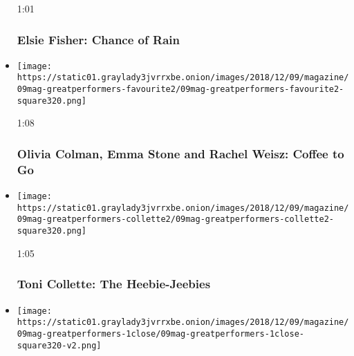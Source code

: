 \begin{itemize}
  1:01

  \hypertarget{elsie-fisher-chance-of-rain}{%
  \subsubsection{Elsie Fisher: Chance of
  Rain}\label{elsie-fisher-chance-of-rain}}
\item
  \href{https://www.nytimes3xbfgragh.onion/video/magazine/100000006246697/olivia-colman-emma-stone-and-rachel-weisz-coffee-to-go.html?action=click\&module=video-series-bar\&region=header\&pgtype=Article\&playlistId=video/great-performers}{}

  \texttt{[image: https://static01.graylady3jvrrxbe.onion/images/2018/12/09/magazine/09mag-greatperformers-favourite2/09mag-greatperformers-favourite2-square320.png]}

  1:08

  \hypertarget{olivia-colman-emma-stone-and-rachel-weisz-coffee-to-go}{%
  \subsubsection{Olivia Colman, Emma Stone and Rachel Weisz: Coffee to
  Go}\label{olivia-colman-emma-stone-and-rachel-weisz-coffee-to-go}}
\item
  \href{https://www.nytimes3xbfgragh.onion/video/magazine/100000006246625/toni-collette-the-heebie-jeebies.html?action=click\&module=video-series-bar\&region=header\&pgtype=Article\&playlistId=video/great-performers}{}

  \texttt{[image: https://static01.graylady3jvrrxbe.onion/images/2018/12/09/magazine/09mag-greatperformers-collette2/09mag-greatperformers-collette2-square320.png]}

  1:05

  \hypertarget{toni-collette-the-heebie-jeebies}{%
  \subsubsection{Toni Collette: The
  Heebie-Jeebies}\label{toni-collette-the-heebie-jeebies}}
\item
  \href{https://www.nytimes3xbfgragh.onion/video/magazine/100000006246513/glenn-close-night-shift.html?action=click\&module=video-series-bar\&region=header\&pgtype=Article\&playlistId=video/great-performers}{}

  \texttt{[image: https://static01.graylady3jvrrxbe.onion/images/2018/12/09/magazine/09mag-greatperformers-1close/09mag-greatperformers-1close-square320-v2.png]}


\end{itemize}
